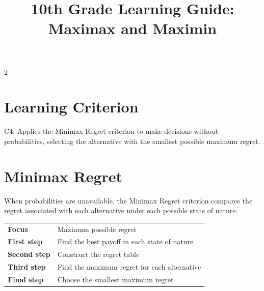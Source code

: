 \makeatletter
{}
\makeatother



\title{10th Grade Learning Guide: Maximax and Maximin}
\author{}
\date{}

\pagestyle{plain}



	\maketitle
	\vspace*{-2.5cm}
	
	\begin{multicols}{2}
		
		
		\section*{Learning Criterion}
		
		C4: Applies the Minimax Regret criterion to make decisions without
		probabilities, selecting the alternative with the smallest possible
		maximum regret.
		
		
		\section{Minimax Regret}
		
		When probabilities are unavailable, the Minimax Regret criterion compares
		the regret associated with each alternative under each possible state of
		nature.
		
		\begin{center}
			\renewcommand{\arraystretch}{1.3}
			\small
			\begin{tabular}{p{}p{}}
				\toprule
				\textbf{Focus}
				& Maximum possible regret \\
				\textbf{First step}
				& Find the best payoff in each state of nature \\
				\textbf{Second step}
				& Construct the regret table \\
				\textbf{Third step}
				& Find the maximum regret for each alternative \\
				\textbf{Final step}
				& Choose the smallest maximum regret \\
				\bottomrule
			\end{tabular}
		\end{center}
		

\end{multicols}

